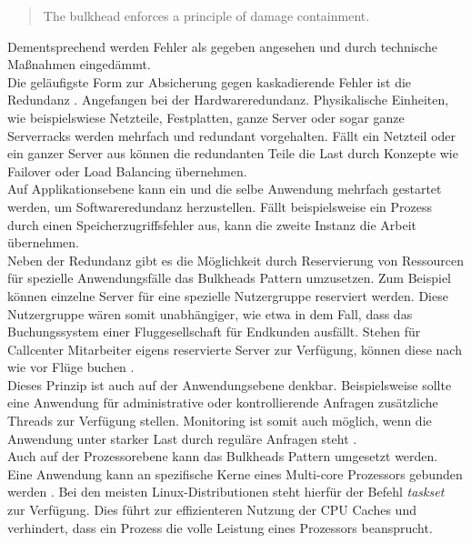 \begin{quotation}
The bulkhead enforces a principle of damage containment.
\end{quotation}

Dementsprechend werden Fehler als gegeben angesehen und durch technische Maßnahmen eingedämmt.\\

Die geläufigste Form zur Absicherung gegen kaskadierende Fehler ist die Redundanz \cite{friedrichsen_unkaputtbar_2014} \cite[S.~95]{nygard_release_2007}. Angefangen bei der Hardwareredundanz. Physikalische Einheiten, wie beispielswiese Netzteile, Festplatten, ganze Server oder sogar ganze Serverracks werden mehrfach und redundant vorgehalten. Fällt ein Netzteil oder ein ganzer Server aus können die redundanten Teile die Last durch Konzepte wie Failover oder Load Balancing übernehmen.\\
Auf Applikationsebene kann ein und die selbe Anwendung mehrfach gestartet werden, um Softwareredundanz herzustellen. Fällt beispielsweise ein Prozess durch einen Speicherzugriffsfehler aus, kann die zweite Instanz die Arbeit übernehmen.\\

Neben der Redundanz gibt es die Möglichkeit durch Reservierung von Ressourcen für spezielle Anwendungsfälle das Bulkheads Pattern umzusetzen. Zum Beispiel können einzelne Server für eine spezielle Nutzergruppe reserviert werden. Diese Nutzergruppe wären somit unabhängiger, wie etwa in dem Fall, dass das Buchungssystem einer Fluggesellschaft für Endkunden ausfällt. Stehen für Callcenter Mitarbeiter eigens reservierte Server zur Verfügung, können diese nach wie vor Flüge buchen \cite[S.~96]{nygard_release_2007}.\\

Dieses Prinzip ist auch auf der Anwendungsebene denkbar. Beispielsweise sollte eine Anwendung für administrative oder kontrollierende Anfragen zusätzliche Threads zur Verfügung stellen. Monitoring ist somit auch möglich, wenn die Anwendung unter starker Last durch reguläre Anfragen steht \cite[S.~98]{nygard_release_2007}.\\

Auch auf der Prozessorebene kann das Bulkheads Pattern umgesetzt werden. Eine Anwendung kann an spezifische Kerne eines Multi-core Prozessors gebunden werden \cite[S.~97]{nygard_release_2007}. Bei den meisten Linux-Distributionen steht hierfür der Befehl \textit{taskset} zur Verfügung. Dies führt zur effizienteren Nutzung der CPU Caches und verhindert, dass ein Prozess die volle Leistung eines Prozessors beansprucht.\\

